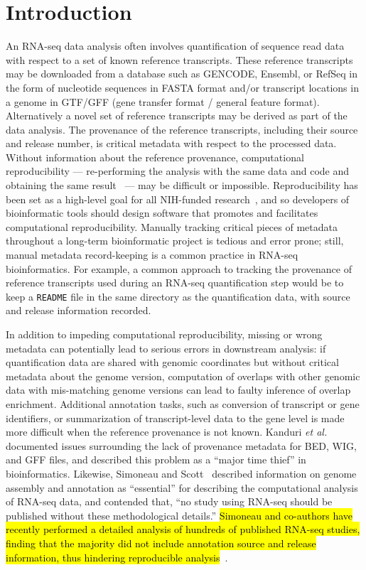 \section*{Introduction}

An RNA-seq data analysis often involves quantification of sequence
read data with respect to a set of known reference transcripts. These
reference transcripts may be downloaded from a database such as
GENCODE, Ensembl, or RefSeq \cite{gencode,ensembl,refseq} in the form
of nucleotide sequences in FASTA format and/or transcript locations in a genome in
GTF/GFF (gene transfer format / general feature format). Alternatively
a novel set of reference transcripts may be derived as part of the data analysis. The
provenance of the reference transcripts, including their source and release
number, is critical metadata with respect to the processed data. Without
information about the reference provenance, computational
reproducibility --- re-performing the analysis with the same data and
code and obtaining the same result~\cite{Patil2016} --- 
may be difficult or impossible. Reproducibility has been set as a
high-level goal for all NIH-funded research~\cite{collins2014,lauer2017}, 
and so developers of bioinformatic tools should design software
that promotes and facilitates computational reproducibility.
Manually tracking
critical pieces of metadata throughout a long-term bioinformatic
project is tedious and error prone; still, manual metadata record-keeping is
a common practice in RNA-seq bioinformatics. For example, a common
approach to tracking the provenance of reference transcripts used during
an RNA-seq quantification step would be to keep a \texttt{README} file
in the same directory as the quantification data, with source and
release information recorded.

In addition to impeding computational reproducibility, missing or
wrong metadata can potentially lead to serious errors in downstream
analysis: if quantification data are shared with genomic coordinates
but without critical metadata about the genome version, computation of
overlaps with other genomic data with mis-matching genome versions can
lead to faulty inference of overlap enrichment. Additional annotation
tasks, such as conversion of transcript or gene identifiers, or
summarization of transcript-level data to the gene level is made more difficult
when the reference provenance is not known. Kanduri \textit{et al.}~\cite{Kanduri2017}
documented issues surrounding the lack of provenance metadata for BED,
WIG, and GFF files, and described this problem as a ``major time
thief'' in bioinformatics. Likewise, Simoneau and
Scott~\cite{Simoneau2019} described 
information on genome assembly and annotation as ``essential'' for
describing the computational analysis of RNA-seq data, and contended
that, ``no study using RNA-seq should be published without these
methodological details.'' \hl{Simoneau and co-authors have recently
performed a detailed analysis of hundreds of published RNA-seq studies,
finding that the majority did not include annotation source and release
information, thus hindering reproducible analysis}~\cite{Simoneau2019BIB}.

